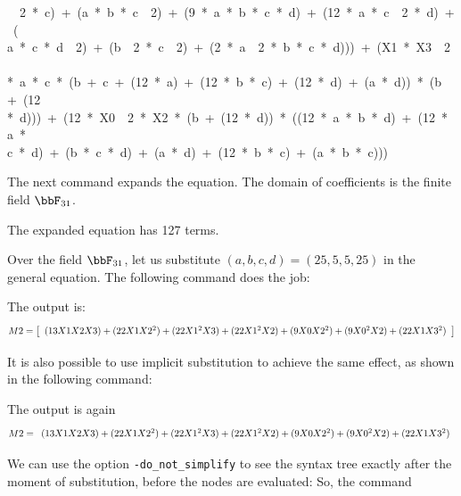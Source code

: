 {\ \ 2\ *\ c)\ +\ (a\ *\ b\ *\ c\ \ 2)\ +\ (9\ *\ a\ *\ b\ *\ c\ *\ d)\ +\ (12\ *\ a\ *\ c\ \ 2\ *\ d)\ +\ (\\
a\ *\ c\ *\ d\ \ 2)\ +\ (b\ \ 2\ *\ c\ \ 2)\ +\ (2\ *\ a\ \ 2\ *\ b\ *\ c\ *\ d)))\ +\ (X1\ *\ X3\ \ 2\ \\
*\ a\ *\ c\ *\ (b\ +\ c\ +\ (12\ *\ a)\ +\ (12\ *\ b\ *\ c)\ +\ (12\ *\ d)\ +\ (a\ *\ d))\ *\ (b\ +\ (12\ \\
*\ d)))\ +\ (12\ *\ X0\ \ 2\ *\ X2\ *\ (b\ +\ (12\ *\ d))\ *\ ((12\ *\ a\ *\ b\ *\ d)\ +\ (12\ *\ a\ *\ \\
c\ *\ d)\ +\ (b\ *\ c\ *\ d)\ +\ (a\ *\ d)\ +\ (12\ *\ b\ *\ c)\ +\ (a\ *\ b\ *\ c)))\\
}
\bigskip

The next command expands the equation. 
The domain of coefficients is the finite field $\bbF_{31}$.


The expanded equation has 127 terms. 


\bigskip

Over the field $\bbF_{31}$,
let us substitute $(a,b,c,d) = (25,5,5,25)$ 
in the general equation.
The following command does the job:


The output is:
$$
M2 = 
\left[
\begin{array}{*{1}c}
(13 X1 X2 X3) + (22 X1 X2^{2}) + (22 X1^{2} X3) + (22 X1^{2} X2) + (9 X0 X2^{2}) + (9 X0^{2} X2) + (22 X1 X3^{2})\\
\end{array}
\right]
$$


\bigskip

It is also possible to use implicit 
substitution to achieve the same effect, 
as shown in the following command:



The output is again 
$$
M2 = 
\begin{array}{*{1}c}
(13 X1 X2 X3) + (22 X1 X2^{2}) + (22 X1^{2} X3) + (22 X1^{2} X2) + (9 X0 X2^{2}) + (9 X0^{2} X2) + (22 X1 X3^{2})\\
\end{array}
$$

We can use the option \verb'-do_not_simplify' 
to see the syntax tree 
exactly after the moment of substitution, 
before the nodes are evaluated:
So, the command 



